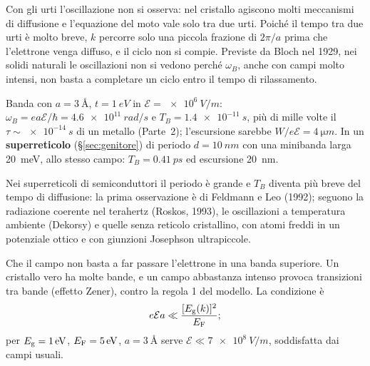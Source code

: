 \documentclass[11pt,a4paper]{article}
\begin{document}
Con gli urti l'oscillazione non si osserva: nel cristallo agiscono molti meccanismi di diffusione e l'equazione del moto vale solo tra due urti.
Poiché il tempo tra due urti è molto breve, $k$ percorre solo una piccola frazione di $2\pi/a$ prima che l'elettrone venga diffuso, e il ciclo non si
compie. Previste da Bloch nel 1929, nei solidi naturali le oscillazioni non si vedono perché $\omega_B$, anche con campi molto intensi, non basta a
completare un ciclo entro il tempo di rilassamento.
\begin{esempio}
Banda con $a=\SI{3}{\angstrom}$, $t=\SI{1}{eV}$ in $\mathcal E=\SI{e6}{V/m}$: $\omega_B=ea\mathcal E/\hbar=\SI{4.6e11}{rad/s}$ e
$T_B=\SI{1.4e-11}{s}$, più di mille volte il $\tau\sim\SI{e-14}{s}$ di un metallo (Parte~2); l'escursione sarebbe $W/e\mathcal E=\SI{4}{\micro m}$. In
un \textbf{superreticolo} (§\ref{sec:genitore}) di periodo $d=\SI{10}{nm}$ con una minibanda larga \SI{20}{meV}, allo stesso campo: $T_B=\SI{0.41}{ps}$
ed escursione \SI{20}{nm}.
\end{esempio}
Nei superreticoli di semiconduttori il periodo è grande e $T_B$ diventa più breve del tempo di diffusione: la prima osservazione è di Feldmann e Leo
(1992); seguono la radiazione coerente nel terahertz (Roskos, 1993), le oscillazioni a temperatura ambiente (Dekorsy) e quelle senza reticolo
cristallino, con atomi freddi in un potenziale ottico e con giunzioni Josephson ultrapiccole.

Che il campo non basta a far passare l'elettrone in una banda superiore. Un cristallo vero ha molte bande, e un campo abbastanza intenso provoca
transizioni tra bande (effetto Zener), contro la regola 1 del modello. La condizione è
\[
e\mathcal E a\ll\frac{[E_{\mathrm g}(k)]^2}{E_{\mathrm F}};
\]
per $E_{\mathrm g}=\SI{1}{eV}$, $E_{\mathrm F}=\SI{5}{eV}$, $a=\SI{3}{\angstrom}$ serve $\mathcal E\ll\SI{7e8}{V/m}$, soddisfatta dai campi usuali.

\end{document}
